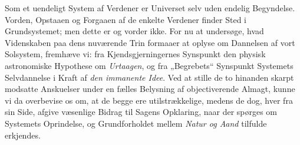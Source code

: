 \documentclass[12pt,a4paper]{book}
\begin{document}
Som et uendeligt System af Verdener er Universet selv uden endelig
Begyndelse. Vorden, Opstaaen og Forgaaen af de enkelte Verdener finder
Sted i Grundsystemet; men dette
er og vorder ikke. For nu at undersøge, hvad Videnskaben paa dens
nuværende Trin formaaer at oplyse om Dannelsen
af vort Solsystem, fremhæve vi: fra Kjendsgjerningernes Synspunkt den
physisk astronomiske Hypothese om \emph{Urtaagen}, og fra „Begrebets“
Synspunkt Systemets Selvdannelse i Kraft af \emph{den immanente Idee}.
Ved at stille de to hinanden skarpt modsatte Anskuelser under en fælles
Belysning af objectiverende Almagt, kunne vi da overbevise os om, at de
begge ere utilstrækkelige, medens de dog, hver fra sin Side, afgive
væsenlige Bidrag til Sagens Opklaring, naar der spørges om Systemets
Oprindelse, og Grundforholdet mellem \emph{Natur og Aand} tilfulde
erkjendes.
\end{document}
